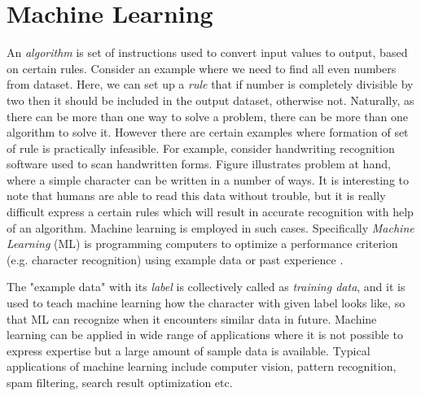 \chapter{Machine Learning}
\label{chap:chap3}

An \emph{algorithm} is set of instructions used to convert input values to output, based on certain rules. Consider an example where we need to find all even numbers from dataset. Here, we can set up a \emph{rule} that if number is completely divisible by two then it should be included in the output dataset, otherwise not. Naturally, as there can be more than one way to solve a problem, there can be more than one algorithm to solve it. However there are certain examples where formation of set of rule is practically infeasible. For example, consider handwriting recognition software used to scan handwritten forms. Figure illustrates problem at hand, where a simple character can be written in a number of ways. It is interesting to note that humans are able to read this data without trouble, but it is really difficult express a certain rules which will result in accurate recognition with help of an algorithm. Machine learning is employed in such cases. Specifically \emph{Machine Learning} (ML) is programming computers to optimize a performance criterion (e.g. character recognition) using example data or past experience \cite{Alpaydin2004}. 


The "example data" with its \emph{label} is collectively called as \emph{training data}, and it is used to teach machine learning how the character with given label looks like, so that ML can recognize when it encounters similar data in future. Machine learning can be applied in wide range of applications where it is not possible to express expertise but a large amount of sample data is available. Typical applications of machine learning include computer vision, pattern recognition, spam filtering, search result optimization etc. 

